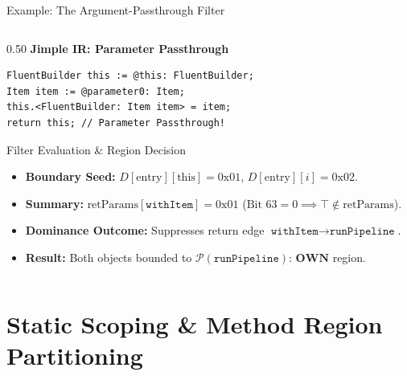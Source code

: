 \documentclass[11pt]{beamer}
\providecommand{\retParams}{\text{retParams}}
\begin{document}
\begin{frame}[fragile]{Example: The Argument-Passthrough Filter}
\begin{columns}[T,onlytextwidth]
    \begin{column}{0.50\textwidth}
      {\scriptsize\bfseries\color{purple!90!black} Jimple IR: Parameter Passthrough}\\[2pt]
\begin{lstlisting}[style=jimplecode, basicstyle=\fontsize{6.2pt}{7.6pt}\selectfont\ttfamily]
FluentBuilder this := @this: FluentBuilder;
Item item := @parameter0: Item;
this.<FluentBuilder: Item item> = item;
return this; // Parameter Passthrough!
\end{lstlisting}
      \vspace{-0.4em}
      \begin{block}{Filter Evaluation \& Region Decision}
        \fontsize{6.0pt}{7.2pt}\selectfont
        \begin{itemize}\setlength{\itemsep}{1pt}\setlength{\parskip}{0pt}\setlength{\parsep}{0pt}
          \item \textbf{Boundary Seed:} $D[\text{entry}][\text{this}] = \text{0x01}$, $D[\text{entry}][i] = \text{0x02}$.
          \item \textbf{Summary:} $\retParams[\texttt{withItem}] = \text{0x01}$ ($\text{Bit 63} = 0 \implies \top \notin \retParams$).
          \item \textbf{Dominance Outcome:} Suppresses return edge $\texttt{withItem} \to \texttt{runPipeline}$.
          \item \textbf{Result:} Both objects bounded to $\mathcal{P}(\texttt{runPipeline})$: $\mathbf{OWN}$ region.
        \end{itemize}
      \end{block}
    \end{column}
  \end{columns}
\end{frame}
\endgroup

\section[Static Scoping \& Regions]{Static Scoping \& Method Region Partitioning}
\end{document}

